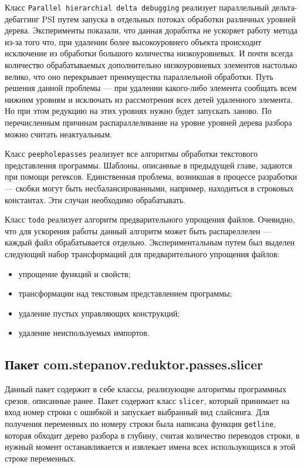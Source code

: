 Класс \texttt{Parallel hierarchial delta debugging} реализует параллельный дельта-дебаггинг PSI путем запуска в отдельных потоках обработки различных уровней дерева. Эксперименты показали, что данная доработка не ускоряет работу метода из-за того что, при удалении более высокоуровнего объекта происходит исключение из обработки большого количества низкоуровневых. И почти всегда количество обрабатываемых дополнительно низкоуровневых элементов настолько велико, что оно перекрывает преимущества параллельной обработки. Путь решения данной проблемы --- при удалении какого-либо элемента сообщать всем нижним уровням и исключать из рассмотрения всех детей удаленного элемента. Но при этом редукцию на этих уровнях нужно будет запускать заново. По перечисленным причинам распараллеливание на уровне уровней дерева разбора можно считать неактуальным. 

Класс \texttt{peepholepasses} реализует все алгоритмы обработки текстового представления программы. Шаблоны, описанные в предыдущей главе, задаются при помощи регексов. Единственная проблема, возникшая в процессе разработки --- скобки могут быть несбалансированными, например, находиться в строковых константах. Эти случаи необходимо обрабатывать.

Класс \texttt{todo} реализует алгоритм предварительного упрощения файлов. Очевидно, что для ускорения работы данный алгоритм может быть распареллелен --- каждый файл обрабатывается отдельно. Экспериментальным путем был выделен следующий набор трансформаций для предварительного упрощения файлов:
\begin{itemize}
	\item упрощение функций и свойств;
	\item трансформации над текстовым представлением программы;
	\item удаление пустых управляющих конструкций;
	\item удаление неиспользуемых импортов.
\end{itemize}


\subsection{Пакет com.stepanov.reduktor.passes.slicer}
Данный пакет содержит в себе классы, реализующие алгоритмы программных срезов, описанные ранее. Пакет содержит класс \texttt{slicer}, который принимает на вход номер строки с ошибкой и запускает выбранный вид слайсинга. Для получения переменных по номеру строки была написана функция \texttt{getline}, которая обходит дерево разбора в глубину, считая количество переводов строки, в нужный момент останавливается и извлекает имена всех использующихся в этой строке переменных. 

